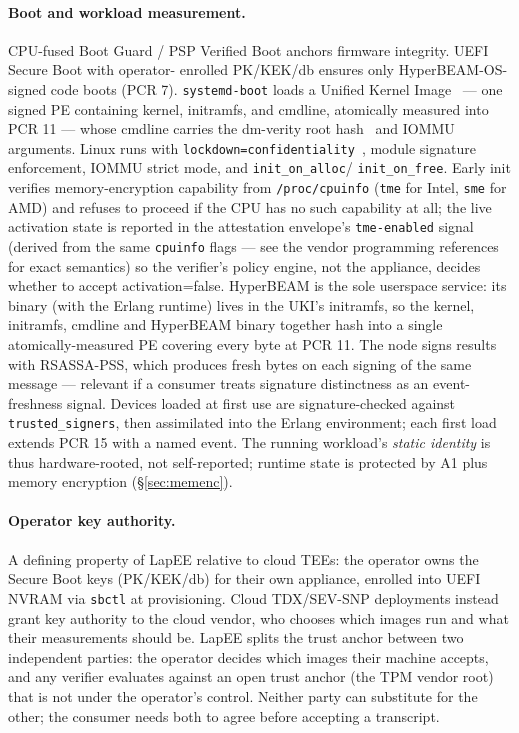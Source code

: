 \documentclass[10pt,a4paper]{article}
\begin{document}
\paragraph{Boot and workload measurement.} CPU-fused Boot Guard / PSP
Verified Boot anchors firmware integrity. UEFI Secure Boot with operator-
enrolled PK/KEK/db ensures only HyperBEAM-OS-signed code boots (PCR 7).
\texttt{systemd-boot} loads a Unified Kernel Image~\cite{systemd-pcrlock}
--- one signed PE containing kernel, initramfs, and cmdline, atomically
measured into PCR 11 --- whose cmdline carries the dm-verity root
hash~\cite{dm-verity} and IOMMU arguments. Linux runs with
\texttt{lockdown=confidentiality}~\cite{lockdown}, module signature
enforcement, IOMMU strict mode, and \texttt{init\_on\_alloc}/
\texttt{init\_on\_free}. Early init verifies memory-encryption capability
from \texttt{/proc/cpuinfo} (\texttt{tme} for Intel, \texttt{sme} for
AMD) and refuses to proceed if the CPU has no such capability at all;
the live activation state is reported in the attestation envelope's
\texttt{tme-enabled} signal (derived from the same \texttt{cpuinfo}
flags --- see the vendor programming references~\cite{intel-tme,amd-sme}
for exact semantics) so the verifier's policy engine, not the appliance,
decides whether to accept activation=false.
HyperBEAM is the sole userspace service: its binary (with the Erlang
runtime) lives in the UKI's initramfs, so the kernel, initramfs, cmdline
and HyperBEAM binary together hash into a single atomically-measured PE
covering every byte at PCR 11. The node signs results with RSASSA-PSS,
which produces fresh bytes on each signing of the same message --- relevant
if a consumer treats signature distinctness as an event-freshness signal.
Devices loaded at first use are signature-checked against
\texttt{trusted\_signers}, then assimilated into the Erlang environment;
each first load extends PCR 15 with a named event. The running workload's
\emph{static identity} is thus hardware-rooted, not self-reported; runtime
state is protected by A1 plus memory encryption (\S\ref{sec:memenc}).

\paragraph{Operator key authority.} A defining property of LapEE
relative to cloud TEEs: the operator owns the Secure Boot keys
(PK/KEK/db) for their own appliance, enrolled into UEFI NVRAM via
\texttt{sbctl} at provisioning. Cloud TDX/SEV-SNP deployments instead
grant key authority to the cloud vendor, who chooses which images run
and what their measurements should be. LapEE splits the trust anchor
between two independent parties: the operator decides which images
their machine accepts, and any verifier evaluates against an open trust
anchor (the TPM vendor root) that is not under the operator's control.
Neither party can substitute for the other; the consumer needs both to
agree before accepting a transcript.
\end{document}
